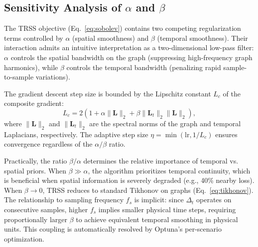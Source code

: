 \subsection{Sensitivity Analysis of $\alpha$ and $\beta$}

The TRSS objective (Eq.~\ref{eq:sobolev}) contains two competing regularization terms controlled by $\alpha$ (spatial smoothness) and $\beta$ (temporal smoothness). Their interaction admits an intuitive interpretation as a two-dimensional low-pass filter: $\alpha$ controls the spatial bandwidth on the graph (suppressing high-frequency graph harmonics), while $\beta$ controls the temporal bandwidth (penalizing rapid sample-to-sample variations).

The gradient descent step size is bounded by the Lipschitz constant $L_c$ of the composite gradient:
\begin{equation}
  L_c = 2\left(1 + \alpha \|\mathbf{L}\|_2 + \beta \|\mathbf{L}_t\|_2 \|\mathbf{L}\|_2\right),
  \label{eq:lipschitz}
\end{equation}
where $\|\mathbf{L}\|_2$ and $\|\mathbf{L}_t\|_2$ are the spectral norms of the graph and temporal Laplacians, respectively. The adaptive step size $\eta = \min(\text{lr}, 1/L_c)$ ensures convergence regardless of the $\alpha/\beta$ ratio.

Practically, the ratio $\beta/\alpha$ determines the relative importance of temporal vs. spatial priors. When $\beta \gg \alpha$, the algorithm prioritizes temporal continuity, which is beneficial when spatial information is severely degraded (e.g., 40\% nearby loss). When $\beta \to 0$, TRSS reduces to standard Tikhonov on graphs (Eq.~\ref{eq:tikhonov}). The relationship to sampling frequency $f_s$ is implicit: since $\Delta_t$ operates on consecutive samples, higher $f_s$ implies smaller physical time steps, requiring proportionally larger $\beta$ to achieve equivalent temporal smoothing in physical units. This coupling is automatically resolved by Optuna's per-scenario optimization.
